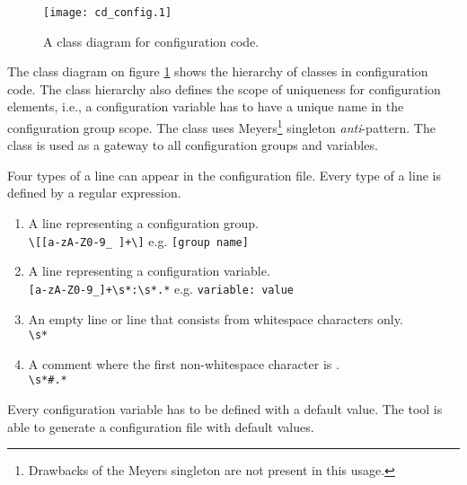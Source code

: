 \begin{figure}[h!]
\caption{A class diagram for configuration code.}
\label{cd-configuration}
\vspace{0.5cm}
\centering
\texttt{[image: cd\_config.1]}
\end{figure}

The class diagram on figure \ref{cd-configuration} shows the hierarchy of classes in configuration code. The class hierarchy also defines the scope of uniqueness for configuration elements, i.e., a configuration variable has to have a unique name in the configuration group scope. The  class uses Meyers\footnote{Drawbacks of the Meyers singleton are not present in this usage.} singleton \emph{anti}-pattern. The class is used as a gateway to all configuration groups and variables.

Four types of a line can appear in the configuration file. Every type of a line is defined by a regular expression.

\begin{enumerate}
\item{A line representing a configuration group.\\ \verb$\[[a-zA-Z0-9_ ]+\]$ e.g. \verb$[group name]$}  
\item{A line representing a configuration variable. \\ \verb$[a-zA-Z0-9_]+\s*:\s*.*$ e.g. \verb$variable: value$}
\item{An empty line or line that consists from whitespace characters only. \\ \verb$\s*$}
\item{A comment where the first non-whitespace character is \code{\#}. \\ \verb$\s*#.*$}
\end{enumerate}

Every configuration variable has to be defined with a default value. The tool is able to generate a configuration file with default values.